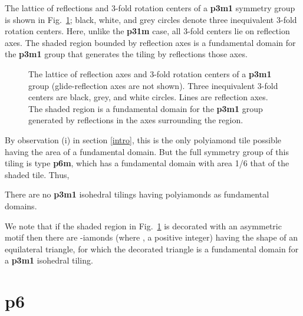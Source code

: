\documentclass{ws-ijcga}
\begin{document}
The lattice of reflections and 3-fold rotation centers of a {\bf p3m1} symmetry group is shown 
in Fig.~\ref{fig:p3m1}; 
black, white, and grey circles denote three inequivalent 3-fold rotation centers. 
Here, unlike the {\bf p31m} case, 
all 3-fold centers lie on reflection axes. 
The shaded region bounded by reflection axes is a fundamental domain for the {\bf p3m1} group 
that generates the tiling by reflections those axes. 
\begin{figure}[h]
\centerline{
}
\vspace*{8pt}
\caption{
The lattice of reflection axes and 3-fold rotation centers of a {\bf p3m1} group 
(glide-reflection axes are not shown). 
Three inequivalent 3-fold centers are black, grey, and white circles. 
Lines are reflection axes. 
The shaded region is a fundamental domain for the {\bf p3m1} group generated by reflections 
in the axes surrounding the region.
\label{fig:p3m1}
    }
\end{figure}
By observation (i) in section \ref{intro}, 
this is the only polyiamond tile possible having the area of a fundamental domain. 
But the full symmetry group of this tiling is type {\bf p6m}, 
which has a fundamental domain with area 1/6 that of the shaded tile. Thus,

\begin{theorem}
There are no {\bf p3m1} isohedral tilings having polyiamonds as fundamental domains.
\end{theorem}

We note that if the shaded region in Fig.~\ref{fig:p3m1} is decorated with an asymmetric motif 
then there are -iamonds (where ,  a positive integer) having the shape of an equilateral triangle, 
for which the decorated triangle is a fundamental domain for a {\bf p3m1} isohedral tiling.












\section{{\bf p6}}
\label{p6}
\end{document}
